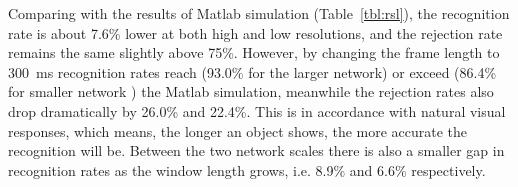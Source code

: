 Comparing with the results of Matlab simulation (Table~\ref{tbl:rsl}), the recognition rate is about 7.6\% lower at both high and low resolutions, and the rejection rate remains the same slightly above 75\%. 
However, by changing the frame length to 300~ms recognition rates reach (93.0\% for the larger network) or exceed (86.4\% for smaller network ) the Matlab simulation, meanwhile the rejection rates also drop dramatically by 26.0\% and 22.4\%.
This is in accordance with natural visual responses, which means, the longer an object shows, the more accurate the recognition will be.
Between the two network scales there is also a smaller gap in recognition rates as the window length grows, i.e. 8.9\% and 6.6\% respectively.

